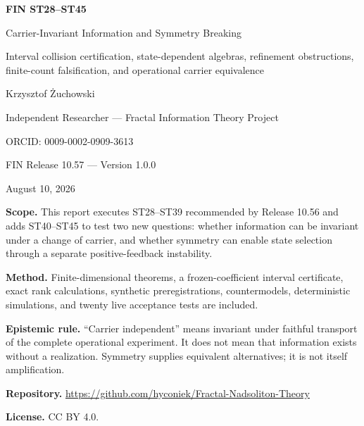 \documentclass[11pt,a4paper]{article}
\begin{document}
\begin{titlepage}
\centering
\vspace*{1.30cm}
{\LARGE\bfseries FIN ST28--ST45\par}
\vspace{0.35cm}
{\Large Carrier-Invariant Information and Symmetry Breaking\par}
\vspace{0.40cm}
{\large Interval collision certification, state-dependent algebras, refinement obstructions, finite-count falsification, and operational carrier equivalence\par}
\vspace{1.10cm}
{\Large Krzysztof Żuchowski\par}
\vspace{0.24cm}
{\large Independent Researcher --- Fractal Information Theory Project\par}
{\large ORCID: 0009-0002-0909-3613\par}
\vspace{0.90cm}
{\large FIN Release 10.57 --- Version 1.0.0\par}
{\large August 10, 2026\par}
\vfill
\begin{minipage}{0.89\textwidth}
\textbf{Scope.} This report executes ST28--ST39 recommended by Release 10.56 and adds ST40--ST45 to test two new questions: whether information can be invariant under a change of carrier, and whether symmetry can enable state selection through a separate positive-feedback instability.\par
\textbf{Method.} Finite-dimensional theorems, a frozen-coefficient interval certificate, exact rank calculations, synthetic preregistrations, countermodels, deterministic simulations, and twenty live acceptance tests are included.\par
\textbf{Epistemic rule.} ``Carrier independent'' means invariant under faithful transport of the complete operational experiment. It does not mean that information exists without a realization. Symmetry supplies equivalent alternatives; it is not itself amplification.\par
\textbf{Repository.} \url{https://github.com/hyconiek/Fractal-Nadsoliton-Theory}\par
\textbf{License.} CC BY 4.0.
\end{minipage}
\end{titlepage}
\end{document}
